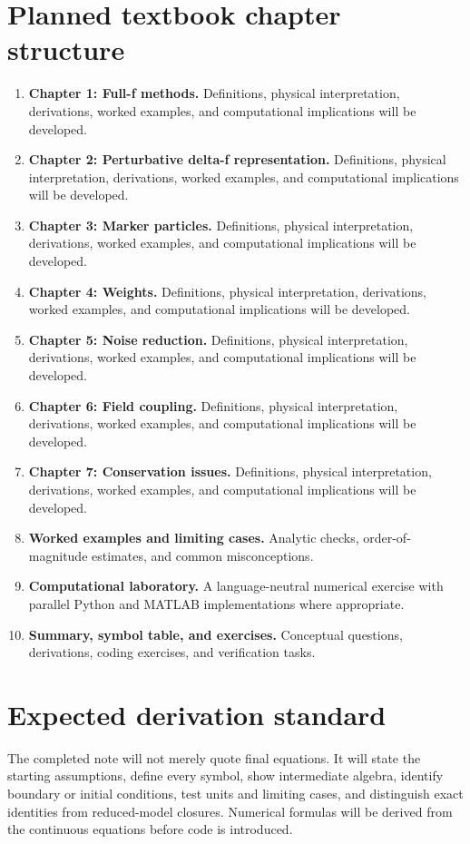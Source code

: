 \documentclass[11pt]{article}
\begin{document}
\section{Planned textbook chapter structure}
\begin{enumerate}[leftmargin=1.8em]
\item \textbf{Chapter 1: Full-f methods.} Definitions, physical interpretation, derivations, worked examples, and computational implications will be developed.
\item \textbf{Chapter 2: Perturbative delta-f representation.} Definitions, physical interpretation, derivations, worked examples, and computational implications will be developed.
\item \textbf{Chapter 3: Marker particles.} Definitions, physical interpretation, derivations, worked examples, and computational implications will be developed.
\item \textbf{Chapter 4: Weights.} Definitions, physical interpretation, derivations, worked examples, and computational implications will be developed.
\item \textbf{Chapter 5: Noise reduction.} Definitions, physical interpretation, derivations, worked examples, and computational implications will be developed.
\item \textbf{Chapter 6: Field coupling.} Definitions, physical interpretation, derivations, worked examples, and computational implications will be developed.
\item \textbf{Chapter 7: Conservation issues.} Definitions, physical interpretation, derivations, worked examples, and computational implications will be developed.
\item \textbf{Worked examples and limiting cases.} Analytic checks, order-of-magnitude estimates, and common misconceptions.
\item \textbf{Computational laboratory.} A language-neutral numerical exercise with parallel Python and MATLAB implementations where appropriate.
\item \textbf{Summary, symbol table, and exercises.} Conceptual questions, derivations, coding exercises, and verification tasks.
\end{enumerate}

\section{Expected derivation standard}
The completed note will not merely quote final equations. It will state the starting assumptions, define every symbol, show intermediate algebra, identify boundary or initial conditions, test units and limiting cases, and distinguish exact identities from reduced-model closures. Numerical formulas will be derived from the continuous equations before code is introduced.
\end{document}
